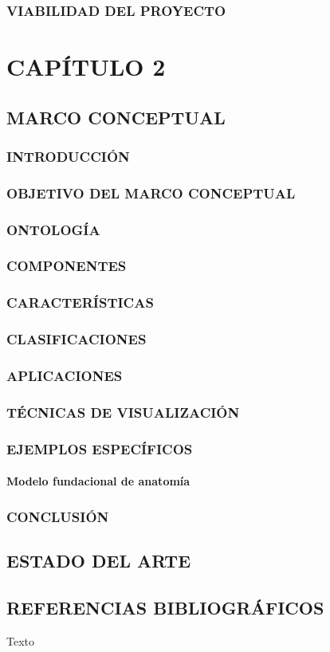 \documentclass{report}
\begin{document}
    \subsection{VIABILIDAD DEL PROYECTO}
    \chapter{CAPÍTULO 2}
    \section{MARCO CONCEPTUAL}
    \subsection{INTRODUCCIÓN}
    \subsection{OBJETIVO DEL MARCO CONCEPTUAL}
    \subsection{ONTOLOGÍA}
    \subsection{COMPONENTES}
    \subsection{CARACTERÍSTICAS}
    \subsection{CLASIFICACIONES}
    \subsection{APLICACIONES}
    \subsection{TÉCNICAS DE VISUALIZACIÓN}
    \subsection{EJEMPLOS ESPECÍFICOS}
    \subsubsection{Modelo fundacional de anatomía}
    \subsection{CONCLUSIÓN}
    \section{ESTADO DEL ARTE}
    \section{REFERENCIAS BIBLIOGRÁFICOS}
    Texto
\end{document}
